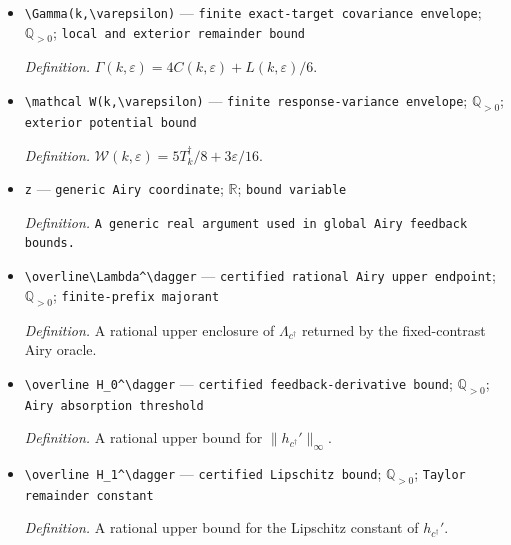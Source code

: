 \documentclass{article}
\begin{document}
\begin{itemize}
  \par\smallskip\noindent\emph{Definition.} \(G_{n,k,\varepsilon}^{\dagger,\mathrm A,0}(r)=n^{4/3}\{n^{-1}-\mathcal B_{n,k,\varepsilon}^{\dagger,\mathrm A,0}(r)\}.\)
  \item \texttt{\textbackslash{}\allowbreak{}Gamma(k,\allowbreak{}\textbackslash{}\allowbreak{}varepsilon)} --- \texttt{finite exact-\allowbreak{}target covariance envelope}; \(\mathbb Q_{>0}\); \texttt{local and exterior remainder bound}
  \par\smallskip\noindent\emph{Definition.} \(\Gamma(k,\varepsilon)=4C(k,\varepsilon)+L(k,\varepsilon)/6\).
  \item \texttt{\textbackslash{}\allowbreak{}mathcal W(k,\allowbreak{}\textbackslash{}\allowbreak{}varepsilon)} --- \texttt{finite response-\allowbreak{}variance envelope}; \(\mathbb Q_{>0}\); \texttt{exterior potential bound}
  \par\smallskip\noindent\emph{Definition.} \(\mathcal W(k,\varepsilon)=5T_k^\dagger/8+3\varepsilon/16\).
  \item \texttt{z} --- \texttt{generic Airy coordinate}; \(\mathbb R\); \texttt{bound variable}
  \par\smallskip\noindent\emph{Definition.} \texttt{A generic real argument used in global Airy feedback bounds.}
  \item \texttt{\textbackslash{}\allowbreak{}overline\textbackslash{}\allowbreak{}Lambda\textasciicircum{}\textbackslash{}\allowbreak{}dagger} --- \texttt{certified rational Airy upper endpoint}; \(\mathbb Q_{>0}\); \texttt{finite-\allowbreak{}prefix majorant}
  \par\smallskip\noindent\emph{Definition.} A rational upper enclosure of \(\Lambda_{c^\dagger}\) returned by the fixed-contrast Airy oracle.
  \item \texttt{\textbackslash{}\allowbreak{}overline H\_\allowbreak{}0\textasciicircum{}\textbackslash{}\allowbreak{}dagger} --- \texttt{certified feedback-\allowbreak{}derivative bound}; \(\mathbb Q_{>0}\); \texttt{Airy absorption threshold}
  \par\smallskip\noindent\emph{Definition.} A rational upper bound for \(\|h_{c^\dagger}'\|_\infty\).
  \item \texttt{\textbackslash{}\allowbreak{}overline H\_\allowbreak{}1\textasciicircum{}\textbackslash{}\allowbreak{}dagger} --- \texttt{certified Lipschitz bound}; \(\mathbb Q_{>0}\); \texttt{Taylor remainder constant}
  \par\smallskip\noindent\emph{Definition.} A rational upper bound for the Lipschitz constant of \(h_{c^\dagger}'\).

\end{itemize}
\end{document}
